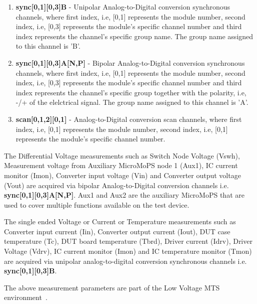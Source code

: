 \begin{enumerate}
\item \textbf{sync[0,1][0,3]B} - Unipolar Analog-to-Digital conversion synchronous channels, where first index, i.e, [0,1] represents the module number, second index, i.e, [0,3] represents the module's specific channel number and third index represents the channel's specific group name. 
The group name assigned to this channel is 'B'.    
\item \textbf{sync[0,1][0,3]A[N,P]} - Bipolar Analog-to-Digital conversion synchronous channels, where first index, i.e, [0,1] represents the module number, second index, i.e, [0,3] represents the module's specific channel number and third index represents the channel's specific group together with the polarity, i.e, -/+ of the elelctrical signal. The group name assigned to this channel is 'A'.
\item \textbf{scan[0,1,2][0,1]} - Analog-to-Digital conversion scan channels, where first index, i.e, [0,1] represents the module number, second index, i.e, [0,1] represents the module's specific channel number.
\end{enumerate}

The Differential Voltage measurements such as Switch Node Voltage (Vswh),  Measurement voltage from Auxiliary MicroMoPS node 1 (Aux1), IC current monitor (Imon), Converter input voltage (Vin) and Converter output voltage (Vout) are acquired via bipolar Analog-to-Digital conversion channels i.e. \textbf{sync[0,1][0,3]A[N,P]}.
Aux1 and Aux2 are the auxiliary MicroMoPS that are used to cover multiple functions available on the test device.

The single ended Voltage or Current or Temperature measurements such as Converter input current (Iin), Converter output current (Iout), DUT case temperature (Tc), DUT board temperature (Tbrd), Driver current (Idrv), Driver Voltage (Vdrv), IC current monitor (Imon) and IC temperature monitor (Tmon) are acquired via unipolar analog-to-digital conversion synchronous channels i.e. \textbf{sync[0,1][0,3]B}. 

The above measurement parameters are part of the Low Voltage MTS environment~\cite{Sleik2018a}.

